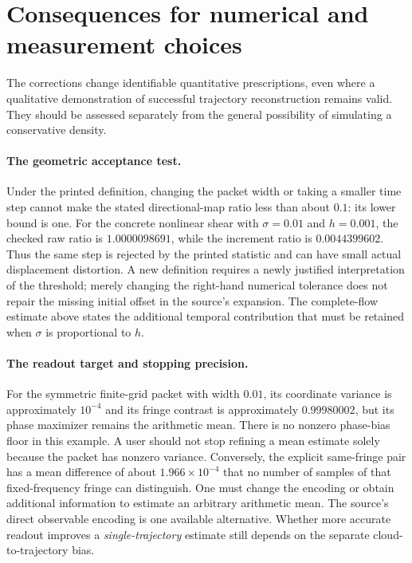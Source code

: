 \section{Consequences for numerical and measurement choices}
\label{sec:consequences}
The corrections change identifiable quantitative prescriptions, even where a
qualitative demonstration of successful trajectory reconstruction remains
valid. They should be assessed separately from the general possibility of
simulating a conservative density.

\paragraph{The geometric acceptance test.}
Under the printed definition, changing the packet width or taking a smaller
time step cannot make the stated directional-map ratio less than about $0.1$:
its lower bound is one. For the concrete nonlinear shear with
$\sigma=0.01$ and $h=0.001$, the checked raw ratio is $1.0000098691$, while the
increment ratio is $0.0044399602$. Thus the same step is rejected by the
printed statistic and can have small actual displacement distortion. A new
definition requires a newly justified interpretation of the threshold; merely
changing the right-hand numerical tolerance does not repair the missing
initial offset in the source's expansion. The complete-flow estimate above
states the additional temporal contribution that must be retained when
$\sigma$ is proportional to $h$.

\paragraph{The readout target and stopping precision.}
For the symmetric finite-grid packet with width $0.01$, its coordinate
variance is approximately $10^{-4}$ and its fringe contrast is approximately
$0.99980002$, but its phase maximizer remains the arithmetic mean. There is
no nonzero phase-bias floor in this example. A user should not stop refining
a mean estimate solely because the packet has nonzero variance. Conversely,
the explicit same-fringe pair has a mean difference of about
$1.966\times10^{-4}$ that no number of samples of that fixed-frequency fringe
can distinguish. One must change the encoding or obtain additional
information to estimate an arbitrary arithmetic mean. The source's direct
observable encoding is one available alternative. Whether more accurate
readout improves a \emph{single-trajectory} estimate still depends on the
separate cloud-to-trajectory bias.

